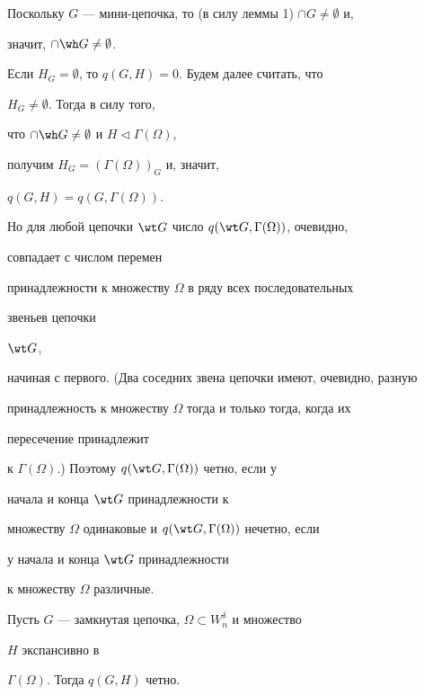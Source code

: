 \begin{pf} 


Поскольку $G$ --- мини-цепочка, то (в силу леммы 1) $\cap 


G\ne\emptyset$ и, 


значит, $\cap\wh G\ne\emptyset$. 


Если $H_G=\emptyset$, то $q(G,H)=0$. Будем далее считать, что 


$H_G\ne\emptyset$. Тогда в силу того, 


что $\cap\wh G\ne\emptyset$ и $H\vartriangleleft\Gamma(\Omega)$, 


получим $H_G=(\Gamma(\Omega))_G$ и, значит, 


$q(G,H)=q(G,\Gamma(\Omega))$. 


Но для любой цепочки $\wt G$ число $q(\wt G,\Gamma(\Omega))$, очевидно, 


совпадает с числом перемен 


принадлежности к множеству $\Omega$ в ряду всех последовательных 


звеньев цепочки 


$\wt G$, 


начиная с первого. (Два соседних звена цепочки имеют, очевидно, разную 


принадлежность к множеству $\Omega$ тогда и только тогда, когда их 


пересечение принадлежит 


к $\Gamma(\Omega)$.) Поэтому $q(\wt G,\Gamma(\Omega))$ четно, если у 


начала и конца $\wt G$ принадлежности к 


множеству $\Omega$ одинаковые и $q(\wt G,\Gamma(\Omega))$ нечетно, если 


у начала и конца $\wt G$ принадлежности 


к множеству $\Omega$ различные. 


\end{pf} 


 


\begin{lem} 


Пусть $G$ --- замкнутая цепочка, $\Omega\subset W^\delta_n$ и множество 


$H$ экспансивно в 


$\Gamma(\Omega)$. Тогда $q(G,H)$ четно. 


\end{lem} 


